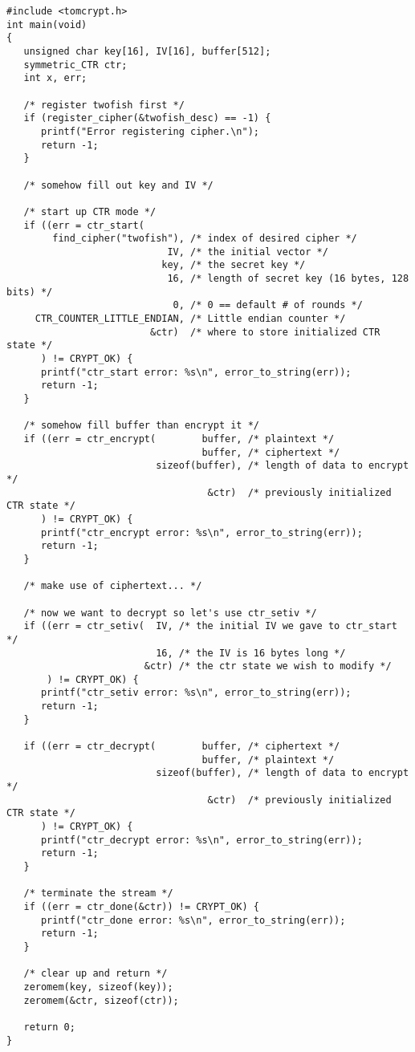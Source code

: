 \documentclass[a4paper]{book}
\begin{document}
\newpage
\begin{small}
\begin{verbatim}
#include <tomcrypt.h>
int main(void)
{
   unsigned char key[16], IV[16], buffer[512];
   symmetric_CTR ctr;
   int x, err;

   /* register twofish first */
   if (register_cipher(&twofish_desc) == -1) {
      printf("Error registering cipher.\n");
      return -1;
   }

   /* somehow fill out key and IV */

   /* start up CTR mode */
   if ((err = ctr_start(
        find_cipher("twofish"), /* index of desired cipher */
                            IV, /* the initial vector */
                           key, /* the secret key */
                            16, /* length of secret key (16 bytes, 128 bits) */
                             0, /* 0 == default # of rounds */
     CTR_COUNTER_LITTLE_ENDIAN, /* Little endian counter */
                         &ctr)  /* where to store initialized CTR state */
      ) != CRYPT_OK) {
      printf("ctr_start error: %s\n", error_to_string(err));
      return -1;
   }

   /* somehow fill buffer than encrypt it */
   if ((err = ctr_encrypt(        buffer, /* plaintext */
                                  buffer, /* ciphertext */
                          sizeof(buffer), /* length of data to encrypt */
                                   &ctr)  /* previously initialized CTR state */
      ) != CRYPT_OK) {
      printf("ctr_encrypt error: %s\n", error_to_string(err));
      return -1;
   }

   /* make use of ciphertext... */

   /* now we want to decrypt so let's use ctr_setiv */
   if ((err = ctr_setiv(  IV, /* the initial IV we gave to ctr_start */
                          16, /* the IV is 16 bytes long */
                        &ctr) /* the ctr state we wish to modify */
       ) != CRYPT_OK) {
      printf("ctr_setiv error: %s\n", error_to_string(err));
      return -1;
   }

   if ((err = ctr_decrypt(        buffer, /* ciphertext */
                                  buffer, /* plaintext */
                          sizeof(buffer), /* length of data to encrypt */
                                   &ctr)  /* previously initialized CTR state */
      ) != CRYPT_OK) {
      printf("ctr_decrypt error: %s\n", error_to_string(err));
      return -1;
   }

   /* terminate the stream */
   if ((err = ctr_done(&ctr)) != CRYPT_OK) {
      printf("ctr_done error: %s\n", error_to_string(err));
      return -1;
   }

   /* clear up and return */
   zeromem(key, sizeof(key));
   zeromem(&ctr, sizeof(ctr));

   return 0;
}
\end{verbatim}
\end{small}
\end{document}
